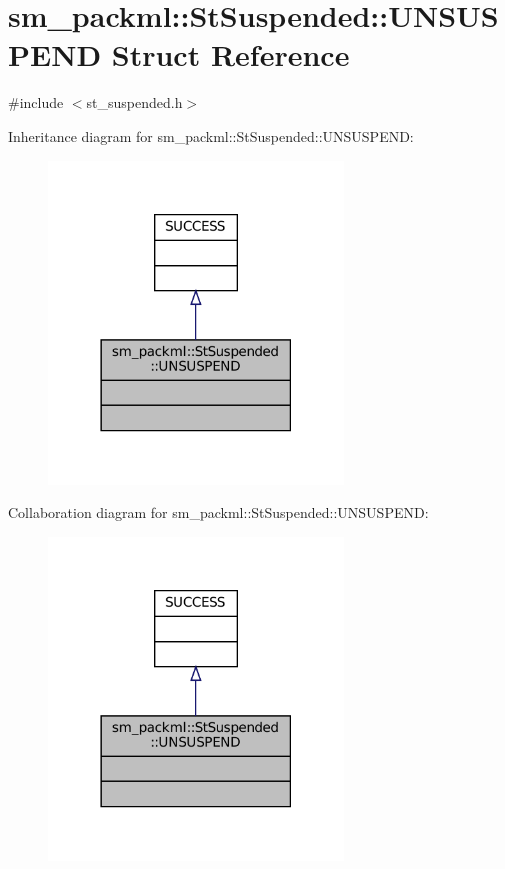 \hypertarget{structsm__packml_1_1StSuspended_1_1UNSUSPEND}{}\section{sm\+\_\+packml\+:\+:St\+Suspended\+:\+:U\+N\+S\+U\+S\+P\+E\+ND Struct Reference}
\label{structsm__packml_1_1StSuspended_1_1UNSUSPEND}


{\ttfamily \#include $<$st\+\_\+suspended.\+h$>$}



Inheritance diagram for sm\+\_\+packml\+:\+:St\+Suspended\+:\+:U\+N\+S\+U\+S\+P\+E\+ND\+:
\nopagebreak
\begin{figure}[H]
\begin{center}
\leavevmode
\includegraphics[width=222pt]{structsm__packml_1_1StSuspended_1_1UNSUSPEND__inherit__graph}
\end{center}
\end{figure}


Collaboration diagram for sm\+\_\+packml\+:\+:St\+Suspended\+:\+:U\+N\+S\+U\+S\+P\+E\+ND\+:
\nopagebreak
\begin{figure}[H]
\begin{center}
\leavevmode
\includegraphics[width=222pt]{structsm__packml_1_1StSuspended_1_1UNSUSPEND__coll__graph}
\end{center}
\end{figure}


